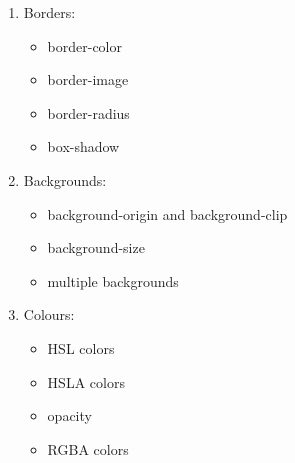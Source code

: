 \begin{itemize}
\begin{enumerate}
		\item Borders:
			\begin{itemize}
				\item border-color
				\item border-image
				\item border-radius
				\item box-shadow		
			\end{itemize}
		
		\item Backgrounds:
		\begin{itemize}
			\item background-origin and background-clip
			\item background-size
			\item multiple backgrounds		
		\end{itemize}
	\newpage 	
	 	\item Colours:
	 	\begin{itemize}
	 		\item HSL colors
	 		\item HSLA colors
	 		\item opacity
	 		\item RGBA colors	
	 	\end{itemize}
	 	

\end{enumerate}
\end{itemize}
